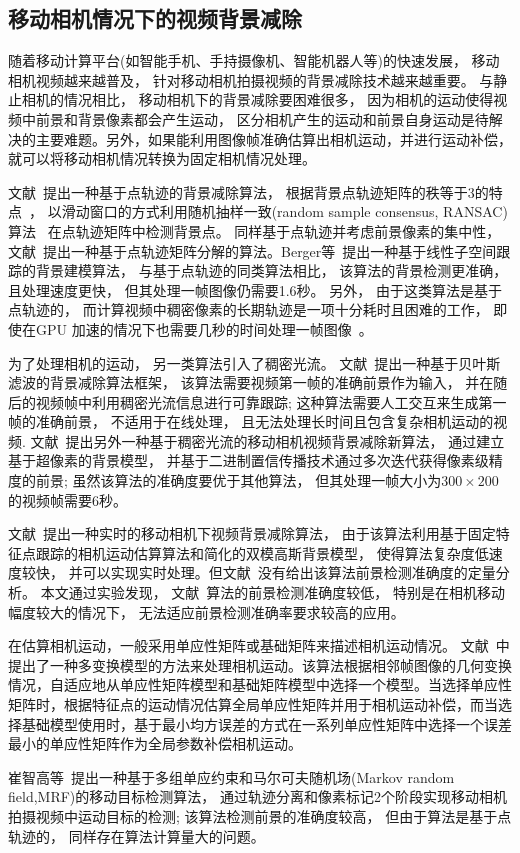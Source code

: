 \subsection{移动相机情况下的视频背景减除}
\label{sec:movingCamera}
随着移动计算平台(如智能手机、手持摄像机、智能机器人等)的快速发展， 移动相机视频越来越普及， 针对移动相机拍摄视频的背景减除技术越来越重要。 与静止相机的情况相比， 移动相机下的背景减除要困难很多， 因为相机的运动使得视频中前景和背景像素都会产生运动， 区分相机产生的运动和前景自身运动是待解决的主要难题。另外，如果能利用图像帧准确估算出相机运动，并进行运动补偿，就可以将移动相机情况转换为固定相机情况处理。\par
 文献~提出一种基于点轨迹的背景减除算法， 根据背景点轨迹矩阵的秩等于3的特点~\cite{Tomasi_1992}， 以滑动窗口的方式利用随机抽样一致(random sample consensus, RANSAC) 算法~\cite{Ransac} 在点轨迹矩阵中检测背景点。 同样基于点轨迹并考虑前景像素的集中性， 文献~\cite{Cui2012}提出一种基于点轨迹矩阵分解的算法。Berger等~\cite{SubspaceTracking}提出一种基于线性子空间跟踪的背景建模算法， 与基于点轨迹的同类算法相比， 该算法的背景检测更准确， 且处理速度更快， 但其处理一帧图像仍需要1.6秒。 另外， 由于这类算法是基于点轨迹的， 而计算视频中稠密像素的长期轨迹是一项十分耗时且困难的工作， 即使在GPU 加速的情况下也需要几秒的时间处理一帧图像~\cite{ECCV10DensePonintTrajectories}。\par

为了处理相机的运动， 另一类算法引入了稠密光流。 文献~提出一种基于贝叶斯滤波的背景减除算法框架， 该算法需要视频第一帧的准确前景作为输入， 并在随后的视频帧中利用稠密光流信息进行可靠跟踪; 这种算法需要人工交互来生成第一帧的准确前景， 不适用于在线处理， 且无法处理长时间且包含复杂相机运动的视频. 文献~提出另外一种基于稠密光流的移动相机视频背景减除新算法， 通过建立基于超像素的背景模型， 并基于二进制置信传播技术通过多次迭代获得像素级精度的前景; 虽然该算法的准确度要优于其他算法， 但其处理一帧大小为$300\times200$的视频帧需要6秒。\par
文献~提出一种实时的移动相机下视频背景减除算法， 由于该算法利用基于固定特征点跟踪的相机运动估算算法和简化的双模高斯背景模型， 使得算法复杂度低速度较快， 并可以实现实时处理。但文献~没有给出该算法前景检测准确度的定量分析。 本文通过实验发现， 文献~算法的前景检测准确度较低， 特别是在相机移动幅度较大的情况下， 无法适应前景检测准确率要求较高的应用。\par
在估算相机运动，一般采用单应性矩阵或基础矩阵来描述相机运动情况。 文献~中提出了一种多变换模型的方法来处理相机运动。该算法根据相邻帧图像的几何变换情况，自适应地从单应性矩阵模型和基础矩阵模型中选择一个模型。当选择单应性矩阵时，根据特征点的运动情况估算全局单应性矩阵并用于相机运动补偿，而当选择基础模型使用时，基于最小均方误差的方式在一系列单应性矩阵中选择一个误差最小的单应性矩阵作为全局参数补偿相机运动。\par
崔智高等~\cite{czg}提出一种基于多组单应约束和马尔可夫随机场(Markov random field,MRF)的移动目标检测算法， 通过轨迹分离和像素标记2个阶段实现移动相机拍摄视频中运动目标的检测; 该算法检测前景的准确度较高， 但由于算法是基于点轨迹的， 同样存在算法计算量大的问题。



